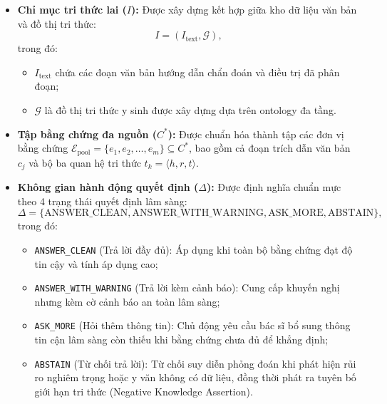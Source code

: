 \begin{itemize}
    \item \textbf{Chỉ mục tri thức lai ($I$):} Được xây dựng kết hợp giữa kho dữ liệu văn bản và đồ thị tri thức:
    \begin{equation}
        I = (I_{\mathrm{text}}, \mathcal{G}),
    \end{equation}
    trong đó:
    \begin{itemize}
        \item $I_{\mathrm{text}}$ chứa các đoạn văn bản hướng dẫn chẩn đoán và điều trị đã phân đoạn;
        \item $\mathcal{G}$ là đồ thị tri thức y sinh được xây dựng dựa trên ontology đa tầng.
    \end{itemize}

    \item \textbf{Tập bằng chứng đa nguồn ($C^*$):} Được chuẩn hóa thành tập các đơn vị bằng chứng $\mathcal{E}_{\mathrm{pool}} = \{e_1, e_2, \ldots, e_m\} \subseteq C^*$, bao gồm cả đoạn trích dẫn văn bản $c_j$ và bộ ba quan hệ tri thức $t_k = \langle h, r, t \rangle$.

    \item \textbf{Không gian hành động quyết định ($\Delta$):} Được định nghĩa chuẩn mực theo 4 trạng thái quyết định lâm sàng:
    \begin{equation}
        \Delta = \{\text{ANSWER\_CLEAN}, \text{ANSWER\_WITH\_WARNING}, \text{ASK\_MORE}, \text{ABSTAIN}\},
    \end{equation}
    trong đó:
    \begin{itemize}
        \item \texttt{ANSWER\_CLEAN} (Trả lời đầy đủ): Áp dụng khi toàn bộ bằng chứng đạt độ tin cậy và tính áp dụng cao;
        \item \texttt{ANSWER\_WITH\_WARNING} (Trả lời kèm cảnh báo): Cung cấp khuyến nghị nhưng kèm cờ cảnh báo an toàn lâm sàng;
        \item \texttt{ASK\_MORE} (Hỏi thêm thông tin): Chủ động yêu cầu bác sĩ bổ sung thông tin cận lâm sàng còn thiếu khi bằng chứng chưa đủ để khẳng định;
        \item \texttt{ABSTAIN} (Từ chối trả lời): Từ chối suy diễn phỏng đoán khi phát hiện rủi ro nghiêm trọng hoặc y văn không có dữ liệu, đồng thời phát ra tuyên bố giới hạn tri thức (Negative Knowledge Assertion).
    \end{itemize}
\end{itemize}

